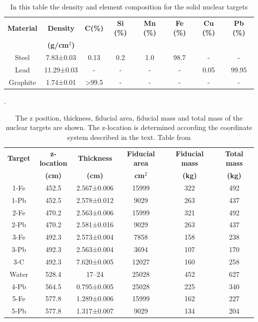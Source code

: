\begin{itemize}
    \begin{table}[!htb]
        \centering
        \begin{tabular}{c c c c c c c c}
            \textbf{Material} & \textbf{Density} & \textbf{C(\%)} & \textbf{Si (\%)} & \textbf{Mn (\%)} & \textbf{Fe (\%)} & \textbf{Cu (\%)} & \textbf{Pb (\%)} \\ 
             & \textbf{(g/cm$^2$)} & & & & & & \\ \hline
            Steel & 7.83±0.03 & 0.13 & 0.2 & 1.0 & 98.7 & - & - \\
            Lead & 11.29±0.03 & - & - & - & - & 0.05 & 99.95\\
            Graphite & 1.74±0.01 & >99.5 & - & - & - & - & - \\ \hline
        \end{tabular}
        \caption{In this table the density and element composition for the solid nuclear targets \cite{ALIAGA2014130}}.
        \label{tab:Chapter2:Detector:NuclearTargetsComposition}
    \end{table}

    \begin{table}[!htb]
        \centering
        \begin{tabular}{c c c c c c}
            \textbf{Target} & \textbf{z-location} & \textbf{Thickness} & \textbf{Fiducial area} & \textbf{Fiducial mass} & \textbf{Total mass}  \\ 
             & \textbf{(cm)} & \textbf{(cm)} & \textbf{cm$^2$} & \textbf{(kg)} & \textbf{(kg)} \\ \hline
            1-Fe & 452.5 & 2.567±0.006 & 15999 & 322 & 492 \\ 
            1-Pb & 452.5 & 2.578±0.012 & 9029 & 263 & 437 \\
            2-Fe & 470.2 & 2.563±0.006 & 15999 & 321 & 492 \\ 
            2-Pb & 470.2 & 	2.581±0.016 & 9029 & 263 & 437 \\
            3-Fe & 492.3 & 	2.573±0.004 & 7858 & 158 & 238 \\ 
            3-Pb & 492.3 & 2.563±0.004 & 3694 & 107 & 170 \\
            3-C & 492.3 & 7.620±0.005 & 12027 & 160 & 258 \\ 
            Water & 528.4 & 17–24 & 25028 & 452 & 627 \\
            4-Pb & 564.5 & 0.795±0.005 & 25028 & 225 & 340 \\
            5-Fe & 577.8 & 1.289±0.006 & 15999 & 162 & 227 \\ 
            5-Pb & 577.8 & 1.317±0.007 & 9029 & 134 & 204 \\ \hline
        \end{tabular}
        \caption{The z position, thickness, fiducial area, fiducial mass and total mass of the nuclear targets are shown. The z-location is determined according the coordinate system described in the text. Table from \cite{ALIAGA2014130} }
        \label{tab:Chapter2:Detector:Sizes}
    \end{table}


\end{itemize}
